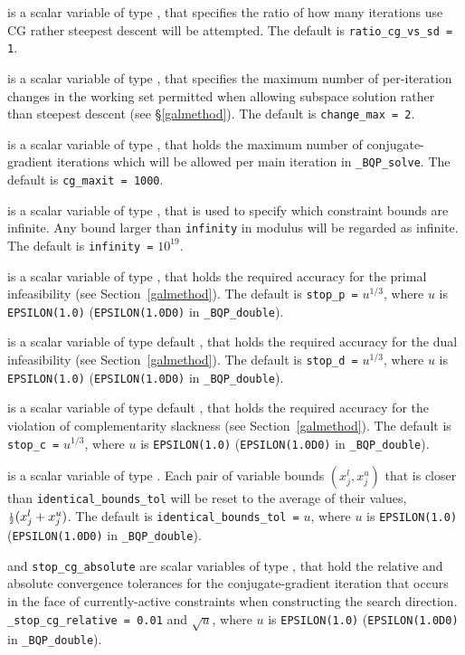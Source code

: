 \documentclass{galahad}
\newcommand{\packagename}{BQP}
\newcommand{\fullpackagename}{\libraryname\_\packagename}
\newcommand{\solver}{{\tt \fullpackagename\_solve}}
\begin{document}
\begin{description}
 is a scalar variable of type \integer, 
that specifies the ratio of how many iterations use CG rather steepest 
descent will be attempted. 
The default is {\tt ratio\_cg\_vs\_sd = 1}.

 is a scalar variable of type \integer, that
specifies the maximum number of per-iteration changes in the working set
permitted when allowing subspace solution rather than steepest descent
(see \S\ref{galmethod}).
The default is {\tt change\_max = 2}.

 is a scalar variable of type \integer, that holds the
maximum number of conjugate-gradient iterations which will be allowed 
per main iteration in \solver.
The default is {\tt cg\_maxit = 1000}.

 is a scalar variable of type \realdp, that is used to
specify which constraint bounds are infinite.
Any bound larger than {\tt infinity} in modulus will be regarded as infinite.
The default is {\tt infinity =} $10^{19}$.

 is a scalar variable of type \realdp, that holds the
required accuracy for the primal infeasibility (see Section~\ref{galmethod}).
The default is {\tt stop\_p =} $u^{1/3}$,
where $u$ is {\tt EPSILON(1.0)} ({\tt EPSILON(1.0D0)} in 
{\tt \fullpackagename\_double}).

 is a scalar variable of type default 
\realdp, that holds the
required accuracy for the dual infeasibility (see Section~\ref{galmethod}).
The default is {\tt stop\_d =} $u^{1/3}$,
where $u$ is {\tt EPSILON(1.0)} ({\tt EPSILON(1.0D0)} in 
{\tt \fullpackagename\_double}).

 is a scalar variable of type default 
\realdp, that holds the
required accuracy for the violation of complementarity slackness 
(see Section~\ref{galmethod}).
The default is {\tt stop\_c =} $u^{1/3}$,
where $u$ is {\tt EPSILON(1.0)} ({\tt EPSILON(1.0D0)} in 
{\tt \fullpackagename\_double}).

is a scalar variable of type \realdp.
Each pair of variable bounds $(x_{j}^{l}, x_{j}^{u})$
that is closer than {\tt identical\_bounds\_tol} 
will be reset to the average of their values,
${\scriptstyle \frac{1}{2}} (x_{j}^{l} + x_{j}^{u})$.
The default is {\tt identical\_bounds\_tol =} $u$,
where $u$ is {\tt EPSILON(1.0)} ({\tt EPSILON(1.0D0)} in 
{\tt \fullpackagename\_double}).

 and {\tt stop\_cg\_absolute} 
are scalar variables of type \realdp, 
that hold the relative and absolute convergence tolerances for the
conjugate-gradient iteration that occurs in the face of currently-active
constraints when constructing the search direction.
{\tt \_stop\_cg\_relative = 0.01}
and  $\sqrt{u}$,
where $u$ is {\tt EPSILON(1.0)} ({\tt EPSILON(1.0D0)} in 
{\tt \fullpackagename\_double}).


\end{description}
\end{document}
